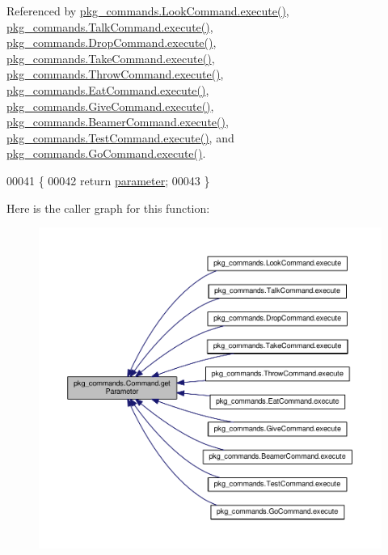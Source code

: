 Referenced by \hyperlink{LookCommand_8java_source_l00026}{pkg\-\_\-commands.\-Look\-Command.\-execute()}, \hyperlink{TalkCommand_8java_source_l00027}{pkg\-\_\-commands.\-Talk\-Command.\-execute()}, \hyperlink{DropCommand_8java_source_l00027}{pkg\-\_\-commands.\-Drop\-Command.\-execute()}, \hyperlink{TakeCommand_8java_source_l00027}{pkg\-\_\-commands.\-Take\-Command.\-execute()}, \hyperlink{ThrowCommand_8java_source_l00028}{pkg\-\_\-commands.\-Throw\-Command.\-execute()}, \hyperlink{EatCommand_8java_source_l00028}{pkg\-\_\-commands.\-Eat\-Command.\-execute()}, \hyperlink{GiveCommand_8java_source_l00029}{pkg\-\_\-commands.\-Give\-Command.\-execute()}, \hyperlink{BeamerCommand_8java_source_l00030}{pkg\-\_\-commands.\-Beamer\-Command.\-execute()}, \hyperlink{TestCommand_8java_source_l00032}{pkg\-\_\-commands.\-Test\-Command.\-execute()}, and \hyperlink{GoCommand_8java_source_l00032}{pkg\-\_\-commands.\-Go\-Command.\-execute()}.


\begin{DoxyCode}
00041                                  \{
00042         \textcolor{keywordflow}{return} \hyperlink{classpkg__commands_1_1Command_a089fe1b30b43b2ad5f0dcb2f0ffc2fdd}{parameter};
00043     \}
\end{DoxyCode}


Here is the caller graph for this function\-:
\nopagebreak
\begin{figure}[H]
\begin{center}
\leavevmode
\includegraphics[width=350pt]{classpkg__commands_1_1Command_a41c92d445be73ea9d62320c65efb8434_icgraph}
\end{center}
\end{figure}


